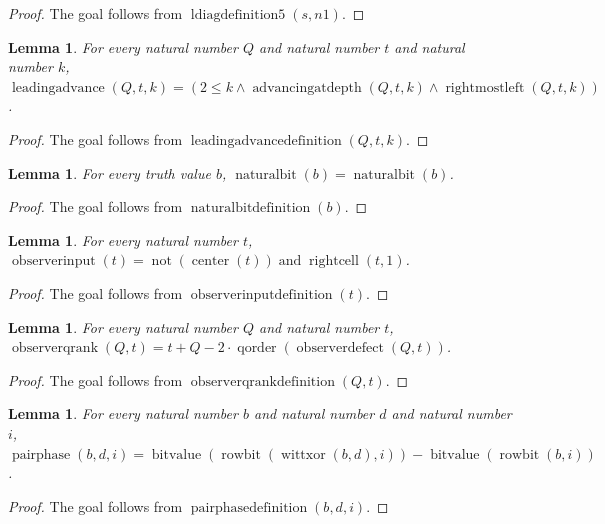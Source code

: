 \documentclass[11pt]{article}
\newtheorem{lemma}[theorem]{Lemma}
\theoremstyle{definition}
\begin{document}
\begin{proof}
The goal follows from \(\operatorname{ldiagdefinition5}(s, n1)\).
\end{proof}
\begin{lemma}
\label{ll:observations:leading-advance-definition}
For every natural number \(Q\) and natural number \(t\) and natural number \(k\), \(\operatorname{leadingadvance}(Q, t, k) = (2 \le k \land \operatorname{advancingatdepth}(Q, t, k) \land \operatorname{rightmostleft}(Q, t, k))\).
\end{lemma}
\begin{proof}
The goal follows from \(\operatorname{leadingadvancedefinition}(Q, t, k)\).
\end{proof}
\begin{lemma}
\label{ll:observations:natural-bit-definition}
For every truth value \(b\), \(\operatorname{naturalbit}(b) = \operatorname{naturalbit}(b)\).
\end{lemma}
\begin{proof}
The goal follows from \(\operatorname{naturalbitdefinition}(b)\).
\end{proof}
\begin{lemma}
\label{ll:observations:observer-input-definition}
For every natural number \(t\), \(\operatorname{observerinput}(t) = \operatorname{not}(\operatorname{center}(t)) \operatorname{and} \operatorname{rightcell}(t, 1)\).
\end{lemma}
\begin{proof}
The goal follows from \(\operatorname{observerinputdefinition}(t)\).
\end{proof}
\begin{lemma}
\label{ll:observations:observer-qrank-definition}
For every natural number \(Q\) and natural number \(t\), \(\operatorname{observerqrank}(Q, t) = t + Q - 2 \cdot \operatorname{qorder}(\operatorname{observerdefect}(Q, t))\).
\end{lemma}
\begin{proof}
The goal follows from \(\operatorname{observerqrankdefinition}(Q, t)\).
\end{proof}
\begin{lemma}
\label{ll:observations:pair-phase-definition}
For every natural number \(b\) and natural number \(d\) and natural number \(i\), \(\operatorname{pairphase}(b, d, i) = \operatorname{bitvalue}(\operatorname{rowbit}(\operatorname{wittxor}(b, d), i)) - \operatorname{bitvalue}(\operatorname{rowbit}(b, i))\).
\end{lemma}
\begin{proof}
The goal follows from \(\operatorname{pairphasedefinition}(b, d, i)\).
\end{proof}
\end{document}
